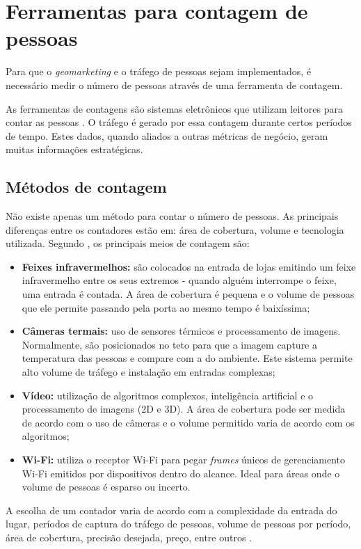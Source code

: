 \section{Ferramentas para contagem de pessoas}
Para que o \emph{geomarketing} e o tráfego de pessoas sejam implementados, é necessário medir o número
de pessoas através de uma ferramenta de contagem.

As ferramentas de contagens são sistemas eletrônicos que utilizam leitores para contar as pessoas
\cite{trafsysdef}. O tráfego é gerado por essa contagem durante
certos períodos de tempo. Estes dados, quando aliados a outras métricas de
negócio, geram muitas informações estratégicas.

\subsection{Métodos de contagem}
Não existe apenas um método para contar o número de pessoas. As principais
diferenças entre os contadores estão em: área de cobertura, volume e tecnologia
utilizada. Segundo , os principais meios de
contagem são:

\begin{itemize}
  \item \textbf{Feixes infravermelhos:} são colocados
na entrada de lojas emitindo um feixe infravermelho entre os seus extremos -
quando alguém interrompe o feixe, uma entrada é contada. A área de cobertura é
pequena e o volume de pessoas que ele permite passando pela porta ao mesmo
tempo é baixíssima;
  \item \textbf{Câmeras termais:} uso de sensores térmicos e
processamento de imagens. Normalmente,
são posicionados no teto para que a imagem capture a temperatura das pessoas
e compare com a do ambiente. Este sistema permite alto volume de tráfego e instalação em entradas complexas;
  \item \textbf{Vídeo:} utilização de algoritmos complexos, inteligência artificial
   e o processamento de imagens (2D e 3D). A área de cobertura
  pode ser medida de acordo com o uso de câmeras e o volume permitido varia de acordo com os algoritmos;
  \item \textbf{Wi-Fi:} utiliza o receptor Wi-Fi para pegar \emph{frames} únicos de gerenciamento Wi-Fi emitidos por dispositivos
  dentro do alcance. Ideal para áreas onde o volume de pessoas é esparso ou incerto.
\end{itemize}

A escolha de um contador varia de acordo com a complexidade da entrada do lugar, períodos de captura do tráfego de pessoas,
volume de pessoas por período, área de cobertura, precisão desejada, preço, entre outros \cite{trafsys} \cite{Axper2017}.

